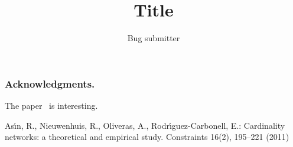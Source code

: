 \documentclass{article}
\begin{document}
\title{Title}
\author{Bug submitter
}
\subsubsection*{Acknowledgments.}

The paper~\cite{Asin11} is interesting.


\begin{thebibliography}{10}
\providecommand{\url}[1]{\texttt{#1}}
\providecommand{\urlprefix}{URL }

As\'{\i}n, R., Nieuwenhuis, R., Oliveras, A., Rodr\'{\i}guez-Carbonell, E.:
Cardinality networks: a theoretical and empirical study. Constraints 16(2),
195--221 (2011)

\end{thebibliography}
\end{document}
